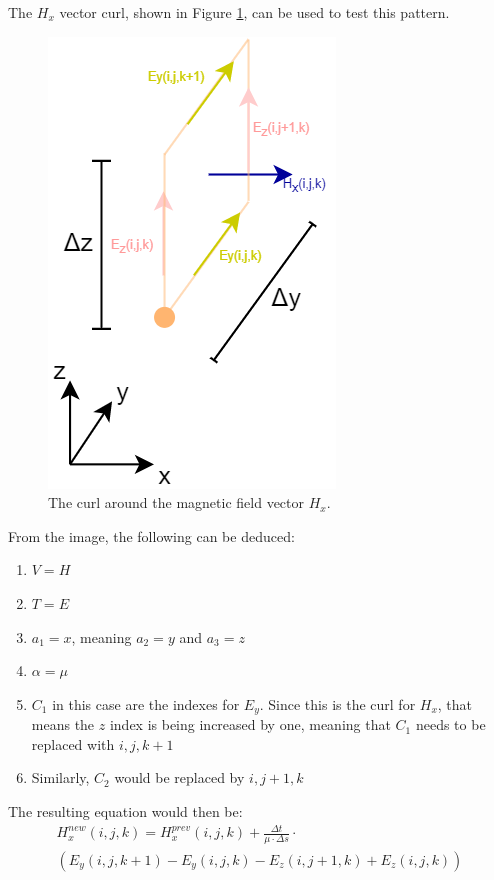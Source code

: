 The $H_x$ vector curl, shown in Figure \ref{fig:fdtd3dHxCurl}, can be used to test this pattern.

\begin{figure}[h!]
	\centering
	\includegraphics[scale=0.6]{Figures/fdtd3dHxCurl}
	\decoRule
	\caption[3D $H_x$ vector curl]{The curl around the magnetic field vector $H_x$.}
	\label{fig:fdtd3dHxCurl}
\end{figure}

From the image, the following can be deduced:

\begin{enumerate}
	\item $V = H$
	\item $T = E$
	\item $a_1 = x$, meaning $a_2 = y$ and $a_3 = z$
	\item $\alpha = \mu$
	\item $C_1$ in this case are the indexes for $E_y$. Since this is the curl for $H_x$, that means the $z$ index is being increased by one, meaning that $C_1$ needs to be replaced with $i,j,k+1$
	\item Similarly, $C_2$ would be replaced by $i,j+1,k$\\
\end{enumerate}

The resulting equation would then be:
\begin{multline}
	\label{eqn:3dHxPatternFinal}
	H_x^{new}(i,j,k) =  H_x^{prev}(i,j,k) + \frac{\Delta t}{\mu \cdot \Delta s} \cdot \\ (E_y(i,j,k+1) - E_y(i,j,k) - E_z(i,j+1,k) + E_z(i,j,k))
\end{multline}

